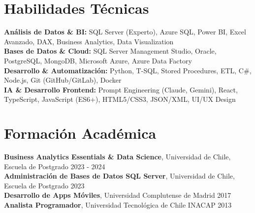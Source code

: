 \documentclass[11pt,letterpaper]{article}
\begin{document}
\section{Habilidades T\'{e}cnicas}
\textbf{Análisis de Datos \& BI:} SQL Server (Experto), Azure SQL, Power BI, Excel Avanzado, DAX, Business Analytics, Data Visualization \\
\textbf{Bases de Datos \& Cloud:} SQL Server Management Studio, Oracle, PostgreSQL, MongoDB, Microsoft Azure, Azure Data Factory \\
\textbf{Desarrollo \& Automatización:} Python, T-SQL, Stored Procedures, ETL, C\#, Node.js, Git (GitHub/GitLab), Docker \\
\textbf{IA \& Desarrollo Frontend:} Prompt Engineering (Claude, Gemini), React, TypeScript, JavaScript (ES6+), HTML5/CSS3, JSON/XML, UI/UX Design

\section{Formaci\'{o}n Acad\'{e}mica}
\textbf{Business Analytics Essentials \& Data Science}, Universidad de Chile, Escuela de Postgrado \hfill 2023 - 2024 \\
\textbf{Administración de Bases de Datos SQL Server}, Universidad de Chile, Escuela de Postgrado \hfill 2023 \\
\textbf{Desarrollo de Apps Móviles}, Universidad Complutense de Madrid \hfill 2017 \\
\textbf{Analista Programador}, Universidad Tecnológica de Chile INACAP \hfill 2013
\end{document}
